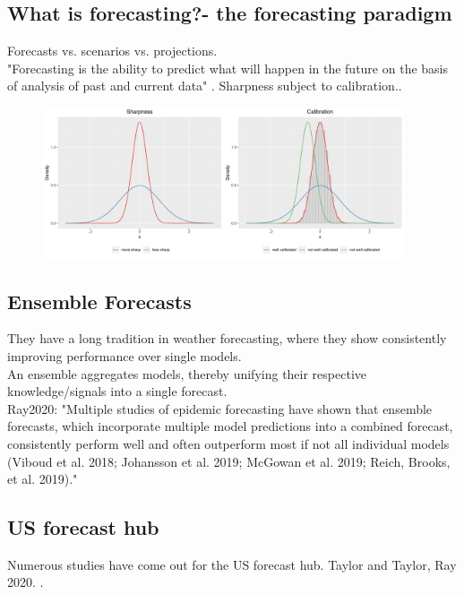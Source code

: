 \subsection{What is forecasting?- the forecasting paradigm}
Forecasts vs. scenarios vs. projections.\\ 
"Forecasting is the ability to predict what will happen in the future on the basis of analysis of past and current data" \cite{moran_epidemic_2016}.
Sharpness subject to calibration.\cite{ray_ensemble_2020}.
\begin{figure}
\centering
\includegraphics[width = 0.95\textwidth]{../plots/sharp_calib.pdf}
\end{figure}

\subsection{Ensemble Forecasts}
They have a long tradition in weather forecasting, where they show consistently improving performance over single models. \\
An ensemble aggregates models, thereby unifying their respective knowledge/signals into a single forecast.\\
Ray2020: "Multiple studies of epidemic forecasting have shown that ensemble forecasts, which incorporate multiple model predictions into a combined forecast, consistently perform well and often outperform most if not all individual models (Viboud et al. 2018; Johansson et al. 2019; McGowan et al. 2019; Reich, Brooks, et al. 2019)."
\subsection{US forecast hub}
Numerous studies have come out for the US forecast hub. Taylor and Taylor, Ray 2020. \cite{ray_ensemble_2020}.
